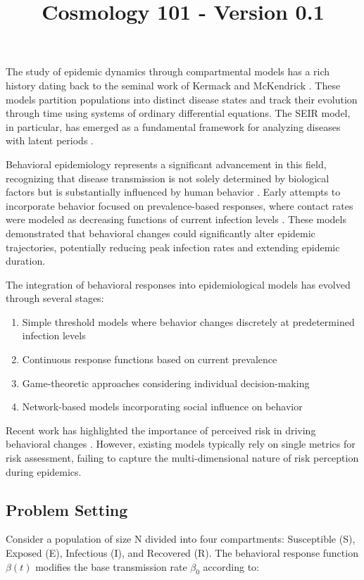 \documentclass{article}\usepackage{graphicx} \usepackage{amsmath} \usepackage{colortbl}\title{Cosmology 101 - Version 0.1}
\begin{document}
The study of epidemic dynamics through compartmental models has a rich history dating back to the seminal work of Kermack and McKendrick \cite{anderson1992infectious}. These models partition populations into distinct disease states and track their evolution through time using systems of ordinary differential equations. The SEIR model, in particular, has emerged as a fundamental framework for analyzing diseases with latent periods \cite{hethcote2000mathematics}.

Behavioral epidemiology represents a significant advancement in this field, recognizing that disease transmission is not solely determined by biological factors but is substantially influenced by human behavior \cite{verelst2016behavioural}. Early attempts to incorporate behavior focused on prevalence-based responses, where contact rates were modeled as decreasing functions of current infection levels \cite{funk2010modelling}. These models demonstrated that behavioral changes could significantly alter epidemic trajectories, potentially reducing peak infection rates and extending epidemic duration.

The integration of behavioral responses into epidemiological models has evolved through several stages:

\begin{enumerate}
\item Simple threshold models where behavior changes discretely at predetermined infection levels
\item Continuous response functions based on current prevalence
\item Game-theoretic approaches considering individual decision-making
\item Network-based models incorporating social influence on behavior
\end{enumerate}

Recent work has highlighted the importance of perceived risk in driving behavioral changes \cite{wang2020impact}. However, existing models typically rely on single metrics for risk assessment, failing to capture the multi-dimensional nature of risk perception during epidemics.

\subsection{Problem Setting}
Consider a population of size N divided into four compartments: Susceptible (S), Exposed (E), Infectious (I), and Recovered (R). The behavioral response function $\beta(t)$ modifies the base transmission rate $\beta_0$ according to:
\end{document}
